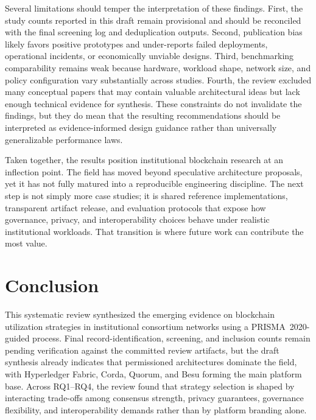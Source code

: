 \documentclass[journal]{IEEEtran}
\begin{document}
Several limitations should temper the interpretation of these findings. First, the study counts reported in this draft remain provisional and should be reconciled with the final screening log and deduplication outputs. Second, publication bias likely favors positive prototypes and under-reports failed deployments, operational incidents, or economically unviable designs. Third, benchmarking comparability remains weak because hardware, workload shape, network size, and policy configuration vary substantially across studies. Fourth, the review excluded many conceptual papers that may contain valuable architectural ideas but lack enough technical evidence for synthesis. These constraints do not invalidate the findings, but they do mean that the resulting recommendations should be interpreted as evidence-informed design guidance rather than universally generalizable performance laws.

Taken together, the results position institutional blockchain research at an inflection point. The field has moved beyond speculative architecture proposals, yet it has not fully matured into a reproducible engineering discipline. The next step is not simply more case studies; it is shared reference implementations, transparent artifact release, and evaluation protocols that expose how governance, privacy, and interoperability choices behave under realistic institutional workloads. That transition is where future work can contribute the most value.

\section{Conclusion}
\label{sec:conclusion}

This systematic review synthesized the emerging evidence on blockchain utilization strategies in institutional consortium networks using a PRISMA~2020-guided process. Final record-identification, screening, and inclusion counts remain pending verification against the committed review artifacts, but the draft synthesis already indicates that permissioned architectures dominate the field, with Hyperledger Fabric, Corda, Quorum, and Besu forming the main platform base. Across RQ1--RQ4, the review found that strategy selection is shaped by interacting trade-offs among consensus strength, privacy guarantees, governance flexibility, and interoperability demands rather than by platform branding alone.
\end{document}
